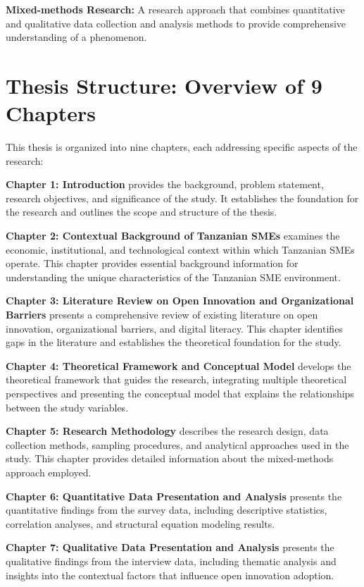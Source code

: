 \documentclass[12pt,a4paper]{article}
\begin{document}
\textbf{Mixed-methods Research:} A research approach that combines quantitative and qualitative data collection and analysis methods to provide comprehensive understanding of a phenomenon.

\section{Thesis Structure: Overview of 9 Chapters}

This thesis is organized into nine chapters, each addressing specific aspects of the research:

\textbf{Chapter 1: Introduction} provides the background, problem statement, research objectives, and significance of the study. It establishes the foundation for the research and outlines the scope and structure of the thesis.

\textbf{Chapter 2: Contextual Background of Tanzanian SMEs} examines the economic, institutional, and technological context within which Tanzanian SMEs operate. This chapter provides essential background information for understanding the unique characteristics of the Tanzanian SME environment.

\textbf{Chapter 3: Literature Review on Open Innovation and Organizational Barriers} presents a comprehensive review of existing literature on open innovation, organizational barriers, and digital literacy. This chapter identifies gaps in the literature and establishes the theoretical foundation for the study.

\textbf{Chapter 4: Theoretical Framework and Conceptual Model} develops the theoretical framework that guides the research, integrating multiple theoretical perspectives and presenting the conceptual model that explains the relationships between the study variables.

\textbf{Chapter 5: Research Methodology} describes the research design, data collection methods, sampling procedures, and analytical approaches used in the study. This chapter provides detailed information about the mixed-methods approach employed.

\textbf{Chapter 6: Quantitative Data Presentation and Analysis} presents the quantitative findings from the survey data, including descriptive statistics, correlation analyses, and structural equation modeling results.

\textbf{Chapter 7: Qualitative Data Presentation and Analysis} presents the qualitative findings from the interview data, including thematic analysis and insights into the contextual factors that influence open innovation adoption.
\end{document}
